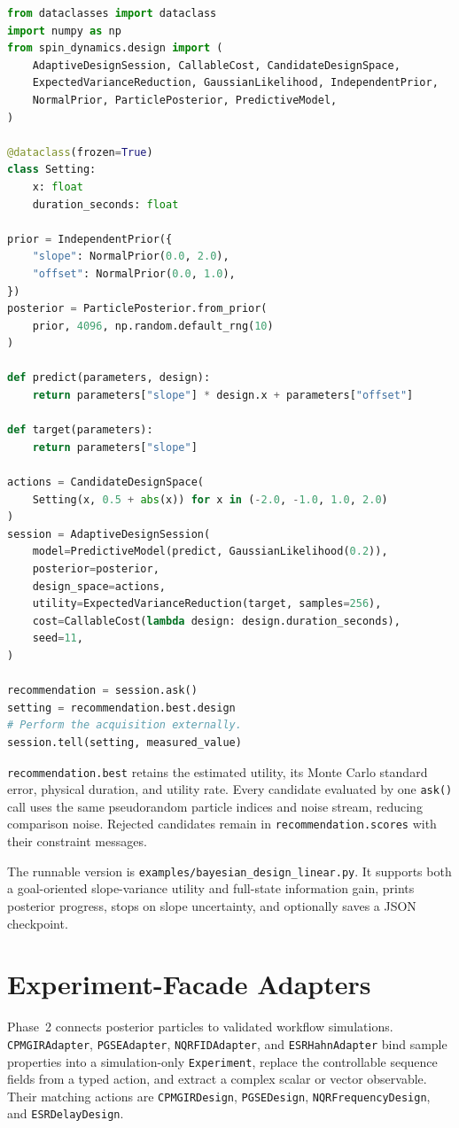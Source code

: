 \documentclass[11pt,oneside]{report}
\newcommand{\code}[1]{\texttt{#1}}
\begin{document}
\begin{lstlisting}[language=Python]
from dataclasses import dataclass
import numpy as np
from spin_dynamics.design import (
    AdaptiveDesignSession, CallableCost, CandidateDesignSpace,
    ExpectedVarianceReduction, GaussianLikelihood, IndependentPrior,
    NormalPrior, ParticlePosterior, PredictiveModel,
)

@dataclass(frozen=True)
class Setting:
    x: float
    duration_seconds: float

prior = IndependentPrior({
    "slope": NormalPrior(0.0, 2.0),
    "offset": NormalPrior(0.0, 1.0),
})
posterior = ParticlePosterior.from_prior(
    prior, 4096, np.random.default_rng(10)
)

def predict(parameters, design):
    return parameters["slope"] * design.x + parameters["offset"]

def target(parameters):
    return parameters["slope"]

actions = CandidateDesignSpace(
    Setting(x, 0.5 + abs(x)) for x in (-2.0, -1.0, 1.0, 2.0)
)
session = AdaptiveDesignSession(
    model=PredictiveModel(predict, GaussianLikelihood(0.2)),
    posterior=posterior,
    design_space=actions,
    utility=ExpectedVarianceReduction(target, samples=256),
    cost=CallableCost(lambda design: design.duration_seconds),
    seed=11,
)

recommendation = session.ask()
setting = recommendation.best.design
# Perform the acquisition externally.
session.tell(setting, measured_value)
\end{lstlisting}

\code{recommendation.best} retains the estimated utility, its Monte Carlo
standard error, physical duration, and utility rate. Every candidate evaluated
by one \code{ask()} call uses the same pseudorandom particle indices and noise
stream, reducing comparison noise. Rejected candidates remain in
\code{recommendation.scores} with their constraint messages.

The runnable version is \code{examples/bayesian\_design\_linear.py}. It supports
both a goal-oriented slope-variance utility and full-state information gain,
prints posterior progress, stops on slope uncertainty, and optionally saves a
JSON checkpoint.

\section{Experiment-Facade Adapters}

Phase~2 connects posterior particles to validated workflow simulations.
\code{CPMGIRAdapter}, \code{PGSEAdapter}, \code{NQRFIDAdapter}, and
\code{ESRHahnAdapter} bind sample properties into a simulation-only
\code{Experiment}, replace the controllable sequence fields from a typed
action, and extract a complex scalar or vector observable. Their matching
actions are \code{CPMGIRDesign}, \code{PGSEDesign},
\code{NQRFrequencyDesign}, and \code{ESRDelayDesign}.
\end{document}
